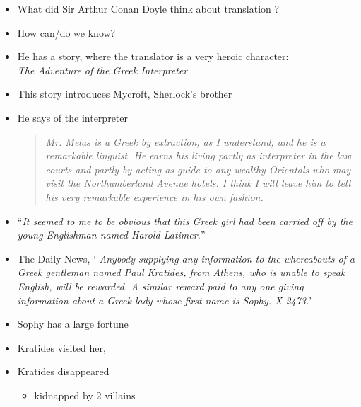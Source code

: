 \documentclass[a4paper,landscape,headrule,footrule,xetex]{foils}
\begin{document}
\renewcommand{\avmvalfont}{\it}
\maketitle



\begin{itemize}
\item What did Sir Arthur Conan Doyle think about translation ?
\item  How can/do we know?
\item He has a story, where the translator is a very heroic character:
  \\
  \textit{The Adventure of the Greek Interpreter} 
  \\ 
\end{itemize}

\begin{itemize}
\item This story introduces Mycroft, Sherlock's brother
\item He says of the interpreter
  \begin{quote}
    \textit{Mr. Melas is a Greek by extraction,
as I understand, and he is a remarkable
linguist. He earns his living partly as interpreter
in the law courts and partly by acting as guide
to any wealthy Orientals who may visit the
Northumberland Avenue hotels. I think I will
leave him to tell his very remarkable
experience in his own fashion. } \end{quote}
\end{itemize}

\begin{itemize}
\item ``\textit{It seemed to me to be obvious that this
Greek girl had been carried off by the young
Englishman named Harold Latimer.}''
\item The Daily News,
` \textit{Anybody supplying any information to the
whereabouts of a Greek gentleman named Paul
Kratides, from Athens, who is unable to speak
English, will be rewarded. A similar reward paid to
any one giving information about a Greek lady
whose first name is Sophy. X 2473.}'
\item Sophy has a large fortune
\item Kratides visited her,
\item Kratides disappeared
  \begin{itemize}
  \item kidnapped by 2 villains
  \end{itemize}
\end{itemize}
\end{document}
